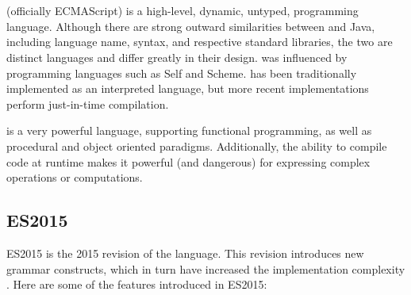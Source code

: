 \section{\javascript}

\javascript (officially ECMAScript) is a high-level, dynamic, untyped, programming language. Although there are strong outward similarities between \javascript and Java, including language name, syntax, and respective standard libraries, the two are distinct languages and differ greatly in their design. \javascript was influenced by programming languages such as Self and Scheme. \javascript has been traditionally implemented as an interpreted language, but more recent implementations perform just-in-time compilation. \cite{javascript16}

\javascript is a very powerful language, supporting functional programming, as well as procedural and object oriented paradigms.  Additionally, the ability to compile code at runtime makes it powerful (and dangerous) for expressing complex operations or computations. \cite{eval16} 

\subsection{ES2015}
ES2015 is the 2015 revision of the \javascript language. This revision introduces new grammar constructs, which in turn have increased the implementation complexity \cite{arrowfn16} \cite{let16} \cite{destructuring16}.  Here are  some of the features introduced in ES2015:

